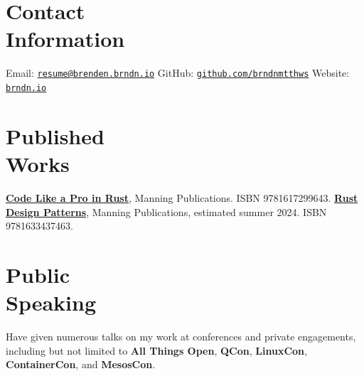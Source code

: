 \documentclass[margin,line]{resume}
\begin{document}
 
\begin{resume}

    \section{\mysidestyle Contact\\Information}

    Email: \href{mailto:resume@brenden.brndn.io}{\texttt{resume@brenden.brndn.io}} \hfill
    GitHub: \href{https://github.com/brndnmtthws}{\texttt{github.com/brndnmtthws}} \hfill
    Website: \href{https://brndn.io}{\texttt{brndn.io}} \hfill
    \vspace{3mm}

    \section{\mysidestyle Published\\Works}

    \href{https://www.manning.com/books/code-like-a-pro-in-rust}{\textbf{Code Like a Pro in Rust}}, Manning Publications. ISBN 9781617299643.
    \linebreak \href{https://www.manning.com/books/rust-design-patterns}{\textbf{Rust Design Patterns}}, Manning Publications,
    estimated summer 2024. ISBN 9781633437463.

    \vspace{3mm}

    \section{\mysidestyle Public\\Speaking}

    Have given numerous talks on my work at conferences and private engagements,
    including but not limited to \textbf{All Things Open}, \textbf{QCon},
    \textbf{LinuxCon}, \textbf{ContainerCon}, and \textbf{MesosCon}.

    \vspace{3mm}


\end{resume}
\end{document}
